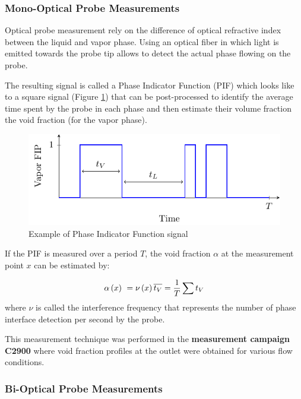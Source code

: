 \subsubsection{Mono-Optical Probe Measurements}


Optical probe measurement rely on the difference of optical refractive index between the liquid and vapor phase. Using an optical fiber in which light is emitted towards the probe tip allows to detect the actual phase flowing on the probe. 

\npar

The resulting signal is called a Phase Indicator Function (PIF) which looks like to a square signal (Figure \ref{fig:FIP}) that can be post-processed to identify the average time spent by the probe in each phase and then estimate their volume fraction \eg the void fraction (for the vapor phase). 


\begin{figure}[!h]
\centering
\includegraphics[width=0.65\linewidth]{img/DEBORA/FIP.pdf}
\caption{Example of Phase Indicator Function signal}
\label{fig:FIP}
\end{figure}



If the PIF is measured over a period $T$, the void fraction $\alpha$ at the measurement point $x$ can be estimated by:


\begin{equation}
\alpha\left( x \right)\ = \nu\left( x \right) \overline{t_{V}} = \frac{1}{T} \sum t_{V}
\end{equation}
where $\nu$ is called the interference frequency that represents the number of phase interface detection per second by the probe.

\begin{note*}{}
This measurement technique was performed in the \textbf{measurement campaign C2900} where void fraction profiles at the outlet were obtained for various flow conditions.
\end{note*}

\subsubsection{Bi-Optical Probe Measurements}


